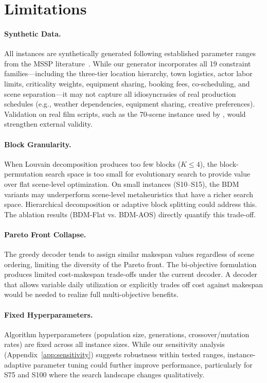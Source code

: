 \section{Limitations}
\label{sec:limitations}

\paragraph{Synthetic Data.}
All instances are synthetically generated following established parameter ranges from the MSSP literature~\citep{bomsdorf2008, liu2019, tekin2023}.
While our generator incorporates all 19 constraint families---including the three-tier location hierarchy, town logistics, actor labor limits, criticality weights, equipment sharing, booking fees, co-scheduling, and scene separation---it may not capture all idiosyncrasies of real production schedules (e.g., weather dependencies, equipment sharing, creative preferences).
Validation on real film scripts, such as the 70-scene instance used by \citet{tekin2023}, would strengthen external validity.

\paragraph{Block Granularity.}
When Louvain decomposition produces too few blocks ($K \leq 4$), the block-permutation search space is too small for evolutionary search to provide value over flat scene-level optimization.
On small instances (S10--S15), the BDM variants may underperform scene-level metaheuristics that have a richer search space.
Hierarchical decomposition or adaptive block splitting could address this.
The ablation results (BDM-Flat vs. BDM-AOS) directly quantify this trade-off.

\paragraph{Pareto Front Collapse.}
The greedy decoder tends to assign similar makespan values regardless of scene ordering, limiting the diversity of the Pareto front.
The bi-objective formulation produces limited cost-makespan trade-offs under the current decoder.
A decoder that allows variable daily utilization or explicitly trades off cost against makespan would be needed to realize full multi-objective benefits.

\paragraph{Fixed Hyperparameters.}
Algorithm hyperparameters (population size, generations, crossover/mutation rates) are fixed across all instance sizes.
While our sensitivity analysis (Appendix~\ref{app:sensitivity}) suggests robustness within tested ranges, instance-adaptive parameter tuning could further improve performance, particularly for S75 and S100 where the search landscape changes qualitatively.

